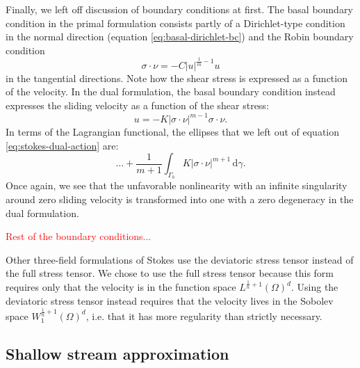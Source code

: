 \documentclass{article}
\theoremstyle{definition}
\theoremstyle{plain}
\newcommand{\ud}{\hspace{2pt}\mathrm{d}}
\begin{document}
Finally, we left off discussion of boundary conditions at first.
The basal boundary condition in the primal formulation consists partly of a Dirichlet-type condition in the normal direction (equation \eqref{eq:basal-dirichlet-bc}) and the Robin boundary condition
\begin{equation}
    \sigma\cdot\nu = -C|u|^{\frac{1}{m} - 1}u
\end{equation}
in the tangential directions.
Note how the shear stress is expressed as a function of the velocity.
In the dual formulation, the basal boundary condition instead expresses the sliding velocity as a function of the shear stress:
\begin{equation}
    u = -K|\sigma\cdot\nu|^{m - 1}\sigma\cdot\nu.
\end{equation}
In terms of the Lagrangian functional, the ellipses that we left out of equation \eqref{eq:stokes-dual-action} are:
\begin{equation}
    \ldots + \frac{1}{m + 1}\int_{\Gamma_b} K|\sigma\cdot\nu|^{m + 1}\ud\gamma.
\end{equation}
Once again, we see that the unfavorable nonlinearity with an infinite singularity around zero sliding velocity is transformed into one with a zero degeneracy in the dual formulation.

\textcolor{red}{Rest of the boundary conditions...}

Other three-field formulations of Stokes use the deviatoric stress tensor instead of the full stress tensor.
We chose to use the full stress tensor because this form requires only that the velocity is in the function space $L^{\frac{1}{n} + 1}(\Omega)^d$.
Using the deviatoric stress tensor instead requires that the velocity lives in the Sobolev space $W^{\frac{1}{n} + 1}_1(\Omega)^d$, i.e. that it has more regularity than strictly necessary.


\subsection{Shallow stream approximation}
\end{document}
